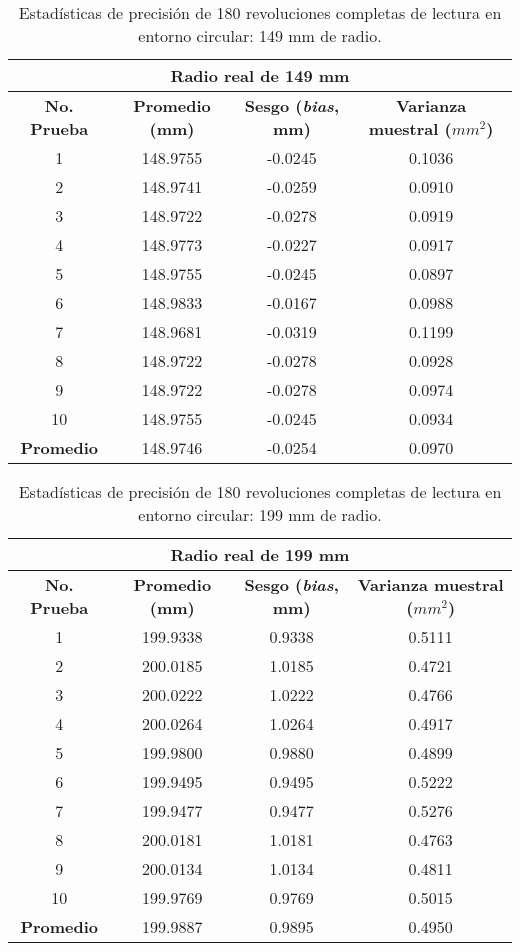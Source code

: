 \begin{table}[!ht]
	\centering
	\begin{tabular}{|c|c|c|c|}
		\hline
		\multicolumn{4}{|c|}{\textbf{Radio real de 149 mm}} \\ \hline
		\textbf{No. Prueba} & \textbf{Promedio (mm)} & \textbf{Sesgo (\textit{bias}, mm)} & \textbf{Varianza muestral ($mm^2$)} \\ \hline
		1 & 148.9755 & -0.0245 & 0.1036 \\ 
		2 & 148.9741 & -0.0259 & 0.0910 \\ 
		3 & 148.9722 & -0.0278 & 0.0919 \\ 
		4 & 148.9773 & -0.0227 & 0.0917 \\ 
		5 & 148.9755 & -0.0245 & 0.0897 \\ 
		6 & 148.9833 & -0.0167 & 0.0988 \\ 
		7 & 148.9681 & -0.0319 & 0.1199 \\ 
		8 & 148.9722 & -0.0278 & 0.0928 \\ 
		9 & 148.9722 & -0.0278 & 0.0974 \\
		10 & 148.9755 & -0.0245 & 0.0934 \\ \hline
		\textbf{Promedio} & 148.9746 & -0.0254 & 0.0970 \\ \hline
	\end{tabular}
	\caption{Estadísticas de precisión de 180 revoluciones completas de lectura en entorno circular: 149 mm de radio.}
	\label{fig:tabla_dists1}
\end{table}

\begin{table}[H]
	\centering
	\begin{tabular}{|c|c|c|c|}
		\hline
		\multicolumn{4}{|c|}{\textbf{Radio real de 199 mm}} \\ \hline
		\textbf{No. Prueba} & \textbf{Promedio (mm)} & \textbf{Sesgo (\textit{bias}, mm)} & \textbf{Varianza muestral ($mm^2$)} \\ \hline
		1 & 199.9338 & 0.9338 & 0.5111 \\ 
		2 & 200.0185 & 1.0185 & 0.4721 \\ 
		3 & 200.0222 & 1.0222 & 0.4766 \\ 
		4 & 200.0264 & 1.0264 & 0.4917 \\ 
		5 & 199.9800 & 0.9880 & 0.4899 \\ 
		6 & 199.9495 & 0.9495 & 0.5222 \\ 
		7 & 199.9477 & 0.9477 & 0.5276 \\ 
		8 & 200.0181 & 1.0181 & 0.4763 \\ 
		9 & 200.0134 & 1.0134 & 0.4811 \\ 
		10 & 199.9769 & 0.9769 & 0.5015 \\ \hline
		\textbf{Promedio} & 199.9887 & 0.9895 & 0.4950 \\ \hline
	\end{tabular}
	\caption{Estadísticas de precisión de 180 revoluciones completas de lectura en entorno circular: 199 mm de radio.}
	\label{fig:tabla_dists2}
\end{table}

